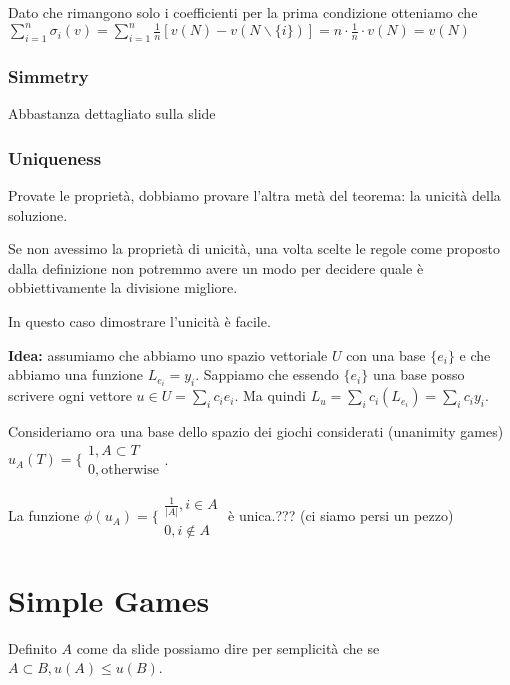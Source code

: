 \documentclass[10pt,a4paper]{report}
\begin{document}
        Dato che rimangono solo i coefficienti per la prima condizione otteniamo che $\sum_{i=1}^n \sigma_i(v) = \sum_{i=1}^n \frac{1}{n} [v(N) - v(N \backslash \{i\})] = n \cdot \frac{1}{n} \cdot v(N) = v(N)$

        \subsubsection{Simmetry}

        Abbastanza dettagliato sulla slide

        \subsubsection{Uniqueness}

        Provate le proprietà, dobbiamo provare l'altra metà del teorema: la unicità della soluzione.

        Se non avessimo la proprietà di unicità, una volta scelte le regole come proposto dalla definizione non potremmo avere un modo per decidere quale è obbiettivamente la divisione migliore.

        In questo caso dimostrare l'unicità è facile.
        
        \textbf{Idea:} assumiamo che abbiamo uno spazio vettoriale $U$ con una base $\{e_i\}$ e che abbiamo una funzione $L_{e_i} = y_i$.
        Sappiamo che essendo $\{e_i\}$ una base posso scrivere ogni vettore $u \in U = \sum_i c_ie_i$. Ma quindi $L_u = \sum_i c_i(L_{e_i}) = \sum_i c_i y_i$.

        Consideriamo ora una base dello spazio dei giochi considerati (unanimity games) $u_A(T) = \big\{ \begin{matrix}
            1, A \subset T \\ 0, \text{otherwise}
        \end{matrix}$.

        La funzione $\phi(u_A) = \{ \begin{matrix}
            \frac{1}{|A|}, i \in A \\
            0, i \notin A
        \end{matrix}$ è unica.??? (ci siamo persi un pezzo)

        \section{Simple Games}

        Definito $A$ come da slide possiamo dire per semplicità che se $A \subset B, u(A) \le u(B)$.
\end{document}
